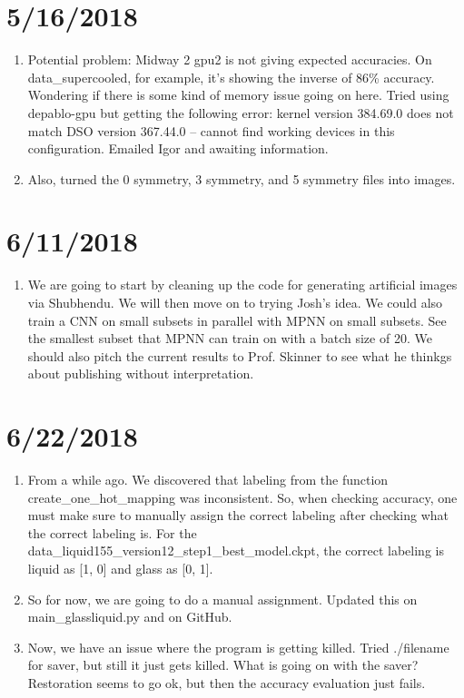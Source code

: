 \documentclass[12pt,reqno]{amsart}
\numberwithin{equation}{section}
\begin{document}
\section{5/16/2018}
\begin{enumerate}
\item Potential problem: Midway 2 gpu2 is not giving expected accuracies.  On data\_supercooled, for example, it's showing the inverse of 86\% accuracy.  Wondering if there is some kind of memory issue going on here.  Tried using depablo-gpu but getting the following error: kernel version 384.69.0 does not match DSO version 367.44.0 -- cannot find working devices in this configuration.  Emailed Igor and awaiting information.  
\item Also, turned the 0 symmetry, 3 symmetry, and 5 symmetry files into images. 
\end{enumerate}

\section{6/11/2018}
\begin{enumerate}
\item We are going to start by cleaning up the code for generating artificial images via Shubhendu.  We will then move on to trying Josh's idea.  We could also train a CNN on small subsets in parallel with MPNN on small subsets.  See the smallest subset that MPNN can train on with a batch size of 20.  We should also pitch the current results to Prof. Skinner to see what he thinkgs about publishing without interpretation.   
\end{enumerate}

\section{6/22/2018}
\begin{enumerate}
\item From a while ago.  We discovered that labeling from the function create\_one\_hot\_mapping was inconsistent.  So, when checking accuracy, one must make sure to manually assign the correct labeling after checking what the correct labeling is.  For the data\_liquid155\_version12\_step1\_best\_model.ckpt, the correct labeling is liquid as [1, 0] and glass as [0, 1].  
\item So for now, we are going to do a manual assignment.  Updated this on main\_glassliquid.py and on GitHub.
\item Now, we have an issue where the program is getting killed.  Tried ./filename for saver, but still it just gets killed.  What is going on with the saver?  Restoration seems to go ok, but then the accuracy evaluation just fails.    
\end{enumerate}
\end{document}

